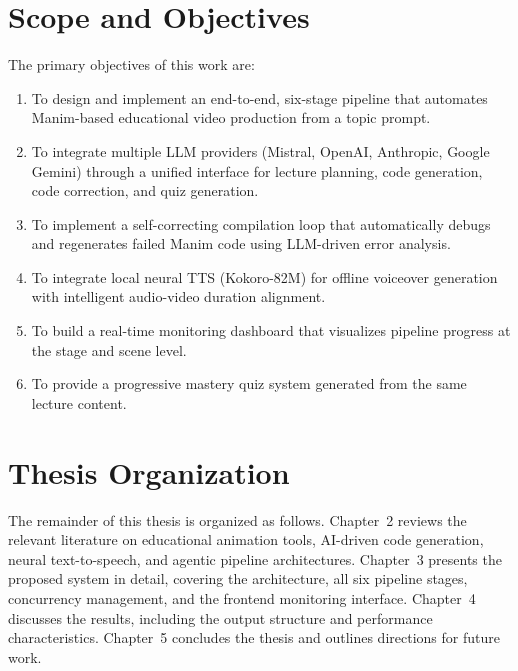 \documentclass[12pt,a4paper,twoside,openright]{report}
\begin{document}
\section{Scope and Objectives}

The primary objectives of this work are:

\begin{enumerate}
  \item To design and implement an end-to-end, six-stage pipeline that automates Manim-based educational video production from a topic prompt.
  \item To integrate multiple LLM providers (Mistral, OpenAI, Anthropic, Google Gemini) through a unified interface for lecture planning, code generation, code correction, and quiz generation.
  \item To implement a self-correcting compilation loop that automatically debugs and regenerates failed Manim code using LLM-driven error analysis.
  \item To integrate local neural TTS (Kokoro-82M) for offline voiceover generation with intelligent audio-video duration alignment.
  \item To build a real-time monitoring dashboard that visualizes pipeline progress at the stage and scene level.
  \item To provide a progressive mastery quiz system generated from the same lecture content.
\end{enumerate}

\section{Thesis Organization}

The remainder of this thesis is organized as follows. Chapter~2 reviews the relevant literature on educational animation tools, AI-driven code generation, neural text-to-speech, and agentic pipeline architectures. Chapter~3 presents the proposed system in detail, covering the architecture, all six pipeline stages, concurrency management, and the frontend monitoring interface. Chapter~4 discusses the results, including the output structure and performance characteristics. Chapter~5 concludes the thesis and outlines directions for future work.

\cleardoublepage


\end{document}
